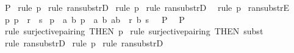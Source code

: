 \begin{isabellebody}
\ {\isachardoublequoteopen}P{\isachardoublequoteclose}\isanewline
%
\isadelimproof
%
\endisadelimproof
%
\isatagproof
{}\isamarkupfalse%
\ {\isacharparenleft}rule\ p{}{\isacharparenright}\isanewline
{}\isamarkupfalse%
\ {\isacharparenleft}rule\ ran{\isacharunderscore}substrD{}{\isacharparenright}\isanewline
{}\isamarkupfalse%
\ {\isacharparenleft}rule\ p{}{\isacharparenright}\isanewline
{}\isamarkupfalse%
\ {\isacharparenleft}rule\ ran{\isacharunderscore}substrD{}{\isacharparenright}\ \isanewline
{}\isamarkupfalse%
\ {\isacharparenleft}rule\ p{}{\isacharparenright}\isanewline
{}\isamarkupfalse%
%
\endisatagproof
{\isafoldproof}%
%
\isadelimproof
\isanewline
%
\endisadelimproof
\isanewline
\isanewline
\isanewline
{}\isamarkupfalse%
\ ran{\isacharunderscore}substrE{\isacharcolon}\isanewline
{}\ p{}{\isacharcolon}\ {\isachardoublequoteopen}p\ {\isacharcolon}\ {\isacharparenleft}r\ {\isacharcolon}{\isacharminus}{\isachargreater}\ s{\isacharparenright}{\isachardoublequoteclose}\isanewline
{}\ p{}{\isacharcolon}\ {\isachardoublequoteopen}{\isacharbang}{\isacharbang}\ a\ b{\isachardot}{\isacharbrackleft}{\isacharbar}\ p\ {\isacharequal}\ {\isacharparenleft}a{\isacharcomma}\ b{\isacharparenright}{\isacharsemicolon}\ {\isacharparenleft}a{\isacharcomma}b{\isacharparenright}\ {\isacharcolon}\ r{\isacharsemicolon}\ b\ {\isachartilde}{\isacharcolon}s\ {\isacharbar}{\isacharbrackright}\ {\isacharequal}{\isacharequal}{\isachargreater}\ P{\isachardoublequoteclose}\isanewline
{}\ \ {\isachardoublequoteopen}P{\isachardoublequoteclose}\isanewline
%
\isadelimproof
%
\endisadelimproof
%
\isatagproof
{}\isamarkupfalse%
\ {\isacharparenleft}rule\ surjective{\isacharunderscore}pairing\ {\isacharbrackleft}THEN\ p{}{\isacharbrackright}{\isacharparenright}\isanewline
{}\isamarkupfalse%
\ {\isacharparenleft}rule\ surjective{\isacharunderscore}pairing\ {\isacharbrackleft}THEN\ subst{\isacharbrackright}{\isacharparenright}\isanewline
{}\isamarkupfalse%
\ {\isacharparenleft}rule\ ran{\isacharunderscore}substrD{}{\isacharparenright}\isanewline
{}\isamarkupfalse%
\ {\isacharparenleft}rule\ p{}{\isacharparenright}\isanewline
{}\isamarkupfalse%
\ {\isacharparenleft}rule\ ran{\isacharunderscore}substrD{}{\isacharparenright}\ \isanewline

\end{isabellebody}
